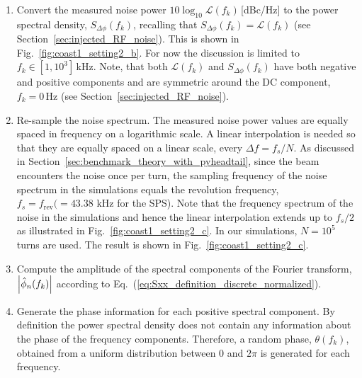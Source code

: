 \begin{enumerate}
    \item  Convert the measured noise power $10\log_{10}\mathcal{L}(f_k)$\,[dBc/Hz] to the power spectral density, $S_{\Delta \phi}(f_k)$, recalling that $S_{\Delta \phi}(f_k) = \mathcal{L}(f_k)$ (see Section~\ref{sec:injected_RF_noise}). This is shown in Fig.~\ref{fig:coast1_setting2_b}. For now the discussion is limited to $f_k \in [1, 10^{3}]$\,kHz. Note, that both $\mathcal{L}(f_k)$ and $S_{\Delta \phi}(f_k)$ have both negative and positive components and are symmetric around the DC component, $f_k=0$\,Hz (see Section~\ref{sec:injected_RF_noise}).

    \item Re-sample the noise spectrum. The measured noise power values are equally spaced in frequency on a logarithmic scale. A linear interpolation is needed so that they are equally spaced on a linear scale, every $\Delta f = f_s/N$. As discussed in Section~\ref{sec:benchmark_theory_with_pyheadtail}, since the beam encounters the noise once per turn, the sampling frequency of the noise spectrum in the simulations equals the revolution frequency, $f_s=f_\mathrm{rev}(=43.38$ kHz for the SPS). Note that the frequency spectrum of the noise in the simulations and hence the linear interpolation extends up to $f_s/2$ as illustrated in Fig.~\ref{fig:coast1_setting2_c}. In our simulations, $N=10^5$ turns are used. The result is shown in Fig.~\ref{fig:coast1_setting2_c}.
    \item Compute the amplitude of the spectral components of the Fourier transform, $\left | \hat{\phi}_n(f_k) \right | $ according to Eq.~(\ref{eq:Sxx_definition_discrete_normalized}). %
    \item Generate the phase information for each positive spectral component. By definition the power spectral density does not contain any information about the phase of the frequency components. Therefore, a random phase,  $\theta(f_k)$, obtained from a uniform distribution between 0 and $2\pi$ is generated for each frequency. 
        

\end{enumerate}
